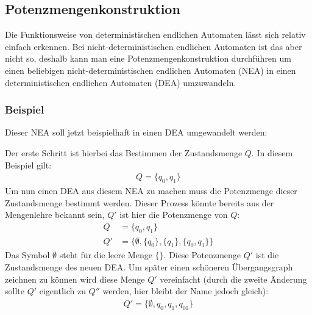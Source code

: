 \subsection{Potenzmengenkonstruktion}
\begin{flushleft}
    Die Funktionsweise von deterministischen endlichen Automaten lässt sich relativ einfach erkennen.
    Bei nicht-deterministischen endlichen Automaten ist das aber nicht so, deshalb kann man eine Potenzmengenkonstruktion 
    durchführen um einen beliebigen nicht-deterministischen endlichen Automaten (NEA) in einen deterministischen endlichen 
    Automaten (DEA) umzuwandeln.
    \subsubsection{Beispiel \cite{potenzmengenkonstruktion}}
    Dieser NEA soll jetzt beispielhaft in einen DEA umgewandelt werden:
    \begin{center}
    \end{center}
    Der erste Schritt ist hierbei das Bestimmen der Zustandsmenge $Q$. In diesem Beispiel gilt:
    \begin{align}
        Q=\{q_0,q_1\}
    \end{align}
    Um nun einen DEA aus diesem NEA zu machen muss die Potenzmenge dieser Zustandsmenge bestimmt werden.
    Dieser Prozess könnte bereits aus der Mengenlehre bekannt sein, $Q'$ ist hier die Potenzmenge von $Q$:
    \begin{align}
        Q &=\{q_0,q_1\} \\
        Q' &=\{\emptyset,\{q_0\},\{q_1\},\{q_0,q_1\}\}
    \end{align}
    Das Symbol $\emptyset$ steht für die leere Menge $\{\}$. Diese Potenzmenge $Q'$ ist die Zustandsmenge 
    des neuen DEA. Um später einen schöneren Übergangsgraph zeichnen zu können wird diese Menge $Q'$ vereinfacht 
    (durch die zweite Änderung sollte $Q'$ eigentlich zu $Q''$ werden, hier bleibt der Name jedoch gleich):
    \begin{align}
        Q' =\{\emptyset,q_0,q_1,q_{01}\}

\end{align}
\end{flushleft}
